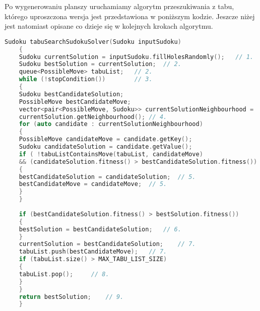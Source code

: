 \documentclass[]{project_report}
\begin{document}
	Po wygenerowaniu planszy uruchamiamy algorytm przeszukiwania z tabu, którego uproszczona wersja jest przedstawiona w poniższym kodzie. Jeszcze niżej jest natomiast opisane co dzieje się w kolejnych krokach algorytmu.
	\begin{lstlisting}[language=C++]
	Sudoku tabuSearchSudokuSolver(Sudoku inputSudoku)
	{
	Sudoku currentSolution = inputSudoku.fillHolesRandomly();	// 1.
	Sudoku bestSolution = currentSolution;	// 2.
	queue<PossibleMove> tabuList;	// 2.
	while (!stopCondition())		// 3.
	{
	Sudoku bestCandidateSolution;
	PossibleMove bestCandidateMove;
	vector<pair<PossibleMove, Sudoku>> currentSolutionNeighbourhood = 							
	currentSolution.getNeighbourhood();	// 4.
	for (auto candidate : currentSolutionNeighbourhood)
	{
	PossibleMove candidateMove = candidate.getKey();
	Sudoku candidateSolution = candidate.getValue();
	if ( !tabuListContainsMove(tabuList, candidateMove) 
	&& (candidateSolution.fitness() > bestCandidateSolution.fitness()) )
	{
	bestCandidateSolution = candidateSolution;	// 5.
	bestCandidateMove = candidateMove;	// 5.
	}
	}
	
	if (bestCandidateSolution.fitness() > bestSolution.fitness())
	{
	bestSolution = bestCandidateSolution;	// 6.
	}
	currentSolution = bestCandidateSolution;	// 7.
	tabuList.push(bestCandidateMove);	// 7.
	if (tabuList.size() > MAX_TABU_LIST_SIZE)
	{
	tabuList.pop();		// 8.
	}
	}
	return bestSolution;	// 9.
	}
	\end{lstlisting}
\end{document}

